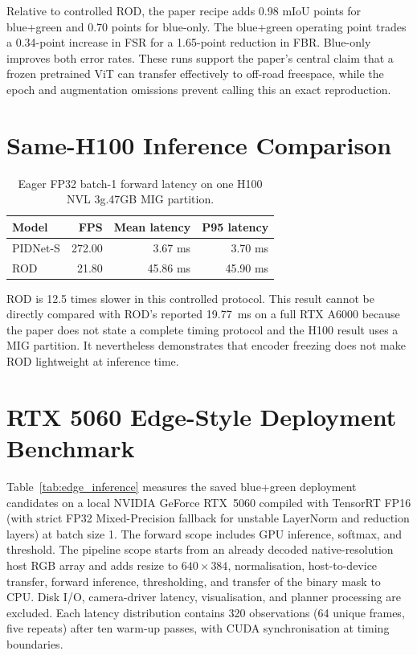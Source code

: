 \documentclass[12pt,a4paper]{report}
\begin{document}
Relative to controlled ROD, the paper recipe adds 0.98 mIoU points for
blue+green and 0.70 points for blue-only. The blue+green operating point trades
a 0.34-point increase in FSR for a 1.65-point reduction in FBR. Blue-only
improves both error rates. These runs support the paper's central claim that a
frozen pretrained ViT can transfer effectively to off-road freespace, while the
epoch and augmentation omissions prevent calling this an exact reproduction.

\section{Same-H100 Inference Comparison}

\begin{table}[H]
\centering
\caption{Eager FP32 batch-1 forward latency on one H100 NVL 3g.47GB MIG partition.}
\label{tab:h100_inference}
\small
\begin{tabular}{@{}lrrr@{}}
\toprule
\textbf{Model} & \textbf{FPS} & \textbf{Mean latency} & \textbf{P95 latency} \\
\midrule
PIDNet-S & 272.00 & 3.67 ms & 3.70 ms \\
ROD      & 21.80  & 45.86 ms & 45.90 ms \\
\bottomrule
\end{tabular}
\end{table}

ROD is 12.5 times slower in this controlled protocol. This result cannot be
directly compared with ROD's reported 19.77~ms on a full RTX A6000 because the
paper does not state a complete timing protocol and the H100 result uses a MIG
partition. It nevertheless demonstrates that encoder freezing does not make
ROD lightweight at inference time.

\section{RTX 5060 Edge-Style Deployment Benchmark}
\label{sec:edge_benchmark}

Table~\ref{tab:edge_inference} measures the saved blue+green deployment
candidates on a local NVIDIA GeForce RTX~5060 compiled with TensorRT FP16 (with strict FP32 Mixed-Precision fallback for unstable LayerNorm and reduction layers) at batch size 1. The forward scope includes GPU inference, softmax, and threshold.
The pipeline scope starts from an already decoded native-resolution host RGB
array and adds resize to $640\times384$, normalisation, host-to-device transfer,
forward inference, thresholding, and transfer of the binary mask to CPU. Disk
I/O, camera-driver latency, visualisation, and planner processing are excluded.
Each latency distribution contains 320 observations (64 unique frames, five
repeats) after ten warm-up passes, with CUDA synchronisation at timing
boundaries.
\end{document}
